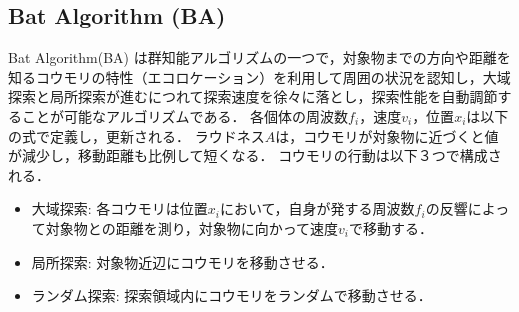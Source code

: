 \documentclass[a4j,11pt]{jarticle}
\begin{document}
\subsection{Bat Algorithm (BA)}
\label{ss:BA}


Bat Algorithm(BA) \cite{BA}は群知能アルゴリズムの一つで，対象物までの方向や距離を知るコウモリの特性（エコロケーション）を利用して周囲の状況を認知し，大域探索と局所探索が進むにつれて探索速度を徐々に落とし，探索性能を自動調節することが可能なアルゴリズムである．
各個体の周波数${f_i}$，速度${v_i}$，位置${x_i}$は以下の式で定義し，更新される．
ラウドネス${A}$は，コウモリが対象物に近づくと値が減少し，移動距離も比例して短くなる．
コウモリの行動は以下３つで構成される．
\begin{itemize}
\item 大域探索: 各コウモリは位置${x_i}$において，自身が発する周波数${f_i}$の反響によって対象物との距離を測り，対象物に向かって速度${v_i}$で移動する．
\item 局所探索: 対象物近辺にコウモリを移動させる．
\item ランダム探索: 探索領域内にコウモリをランダムで移動させる．
\end{itemize}
\end{document}
